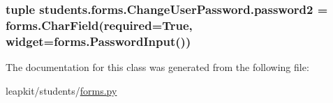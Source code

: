 \hypertarget{classstudents_1_1forms_1_1_change_user_password_a964e8b5309d12749528691a264d9266e}{
\subsubsection[{password2}]{\setlength{\rightskip}{0pt plus 5cm}tuple students.\-forms.\-Change\-User\-Password.\-password2 = forms.\-Char\-Field(required=True, widget=forms.\-Password\-Input())\hspace{0.3cm}{\ttfamily [static]}}}\label{classstudents_1_1forms_1_1_change_user_password_a964e8b5309d12749528691a264d9266e}


The documentation for this class was generated from the following file\-:\begin{DoxyCompactItemize}
\item 
leapkit/students/\hyperlink{forms_8py}{forms.\-py}\end{DoxyCompactItemize}
